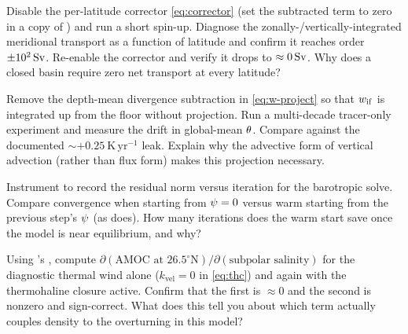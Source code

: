 \begin{exercise}
Disable the per-latitude corrector \eqref{eq:corrector} (set the subtracted term to
zero in a copy of ) and run a short spin-up. Diagnose the
zonally-/vertically-integrated meridional transport as a function of latitude and
confirm it reaches order $\pm 10^2\,\mathrm{Sv}$. Re-enable the corrector and verify it drops to
$\approx 0\,\mathrm{Sv}$. Why does a closed basin require zero net transport at every latitude?
\end{exercise}

\begin{exercise}
Remove the depth-mean divergence subtraction in \eqref{eq:w-project} so that
$w_{\mathrm{if}}$ is integrated up from the floor without projection. Run a
multi-decade tracer-only experiment and measure the drift in global-mean $\theta$.
Compare against the documented $\sim +0.25\ \mathrm{K\,yr^{-1}}$ leak. Explain why the
advective form of vertical advection (rather than flux form) makes this projection
necessary.
\end{exercise}

\begin{exercise}
Instrument  to record the residual norm versus iteration for
the barotropic solve. Compare convergence when starting from $\psi=0$ versus warm
starting from the previous step's $\psi$ (as  does). How many
iterations does the warm start save once the model is near equilibrium, and why?
\end{exercise}

\begin{exercise}
Using \jax's , compute $\partial(\text{AMOC at }26.5^\circ\mathrm{N})/
\partial(\text{subpolar salinity})$ for the diagnostic thermal wind alone
($k_{\mathrm{vel}}=0$ in \eqref{eq:thc}) and again with the thermohaline closure
active. Confirm that the first is $\approx 0$ and the second is nonzero and
sign-correct. What does this tell you about which term actually couples density to the
overturning in this model?
\end{exercise}
